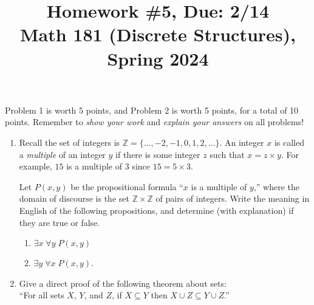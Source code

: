 \documentclass[11pt]{article}
\title{Homework \#5, Due: 2/14 \\Math 181 (Discrete Structures), Spring 2024}
\date{}
\begin{document}
\maketitle

\thispagestyle{empty}

\vspace{-1cm}

Problem 1 is worth 5 points, and Problem 2 is worth 5 points, for a total of 10 points. Remember to \emph{show your work} and \emph{explain your answers} on all problems!

\begin{enumerate}
\item Recall the set of integers is $\mathbb{Z} = \{ \ldots,-2,-1, 0, 1, 2,\ldots\}$. An integer $x$ is called a \emph{multiple} of an integer $y$ if there is some integer $z$ such that $x = z \times y$. For example, $15$ is a multiple of $3$ since $15 = 5 \times 3$.

Let $P(x,y)$ be the propositional formula ``$x$ is a multiple of $y$,'' where the domain of discourse is the set $\mathbb{Z}\times \mathbb{Z}$ of pairs of integers. Write the meaning in English of the following propositions, and determine (with explanation) if they are true or false.
\begin{enumerate}
\item $\exists x \; \forall y \; P(x,y)$
\item $\exists y \; \forall x \; P(x,y)$.
\end{enumerate}

\item Give a direct proof of the following theorem about sets: \\ ``For all sets $X$, $Y$, and $Z$, if $X\subseteq Y$ then $X\cup Z \subseteq Y \cup Z$.''
\end{enumerate}
\end{document}
